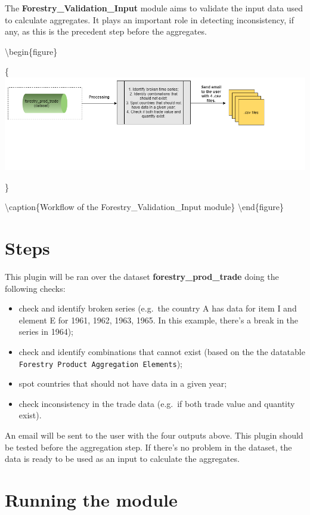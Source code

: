 \documentclass[
]{book}
\providecommand{\tightlist}{%
  \setlength{\itemsep}{0pt}\setlength{\parskip}{0pt}}
\begin{document}
The \textbf{Forestry\_Validation\_Input} module aims to validate the input data used to calculate aggregates. It plays an important role in detecting inconsistency, if any, as this is the precedent step before the aggregates.

\textbackslash begin\{figure\}

\{\centering \includegraphics[width=0.85\linewidth]{images/forestryInputDataValidation}

\}

\textbackslash caption\{Workflow of the Forestry\_Validation\_Input module\}\label{fig:forestryInputDataValidation}
\textbackslash end\{figure\}

\hypertarget{steps-1}{%
\section{\texorpdfstring{\textbf{Steps}}{Steps}}\label{steps-1}}

This plugin will be ran over the dataset \textbf{forestry\_prod\_trade} doing the following checks:

\begin{itemize}
\tightlist
\item
  check and identify broken series (e.g.~the country A has data for item I and element E for 1961, 1962, 1963, 1965. In this example, there's a break in the series in 1964);
\item
  check and identify combinations that cannot exist (based on the the datatable \texttt{Forestry\ Product\ Aggregation\ Elements});
\item
  spot countries that should not have data in a given year;
\item
  check inconsistency in the trade data (e.g.~if both trade value and quantity exist).
\end{itemize}

An email will be sent to the user with the four outputs above. This plugin should be tested before the aggregation step. If there's no problem in the dataset, the data is ready to be used as an input to calculate the aggregates.

\hypertarget{running-the-module-1}{%
\section{\texorpdfstring{\textbf{Running the module}}{Running the module}}\label{running-the-module-1}}
\end{document}
